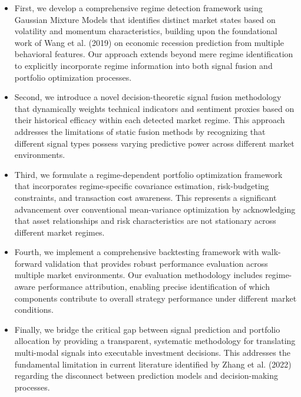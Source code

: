 \documentclass{singlecol-new}
\theoremstyle{TH}{
\newtheorem{lemma}{Lemma}
\newtheorem{theorem}[lemma]{Theorem}
\newtheorem{corrolary}[lemma]{Corrolary}
\newtheorem{conjecture}[lemma]{Conjecture}
\newtheorem{proposition}[lemma]{Proposition}
\newtheorem{claim}[lemma]{Claim}
\newtheorem{stheorem}[lemma]{Wrong Theorem}
\newtheorem{algorithm}{Algorithm}
}
\theoremstyle{THrm}{
\newtheorem{definition}{Definition}[section]
\newtheorem{question}{Question}[section]
\newtheorem{remark}{Remark}
\newtheorem{scheme}{Scheme}
}
\theoremstyle{THhit}{
\newtheorem{case}{Case}[section]
}
\begin{document}
\begin{itemize}

\item First, we develop a comprehensive regime detection framework using Gaussian Mixture Models that identifies distinct market states based on volatility and momentum characteristics, building upon the foundational work of Wang et al. (2019) on economic recession prediction from multiple behavioral features. Our approach extends beyond mere regime identification to explicitly incorporate regime information into both signal fusion and portfolio optimization processes.

\item Second, we introduce a novel decision-theoretic signal fusion methodology that dynamically weights technical indicators and sentiment proxies based on their historical efficacy within each detected market regime. This approach addresses the limitations of static fusion methods by recognizing that different signal types possess varying predictive power across different market environments.

\item Third, we formulate a regime-dependent portfolio optimization framework that incorporates regime-specific covariance estimation, risk-budgeting constraints, and transaction cost awareness. This represents a significant advancement over conventional mean-variance optimization by acknowledging that asset relationships and risk characteristics are not stationary across different market regimes.

\item Fourth, we implement a comprehensive backtesting framework with walk-forward validation that provides robust performance evaluation across multiple market environments. Our evaluation methodology includes regime-aware performance attribution, enabling precise identification of which components contribute to overall strategy performance under different market conditions.

\item Finally, we bridge the critical gap between signal prediction and portfolio allocation by providing a transparent, systematic methodology for translating multi-modal signals into executable investment decisions. This addresses the fundamental limitation in current literature identified by Zhang et al. (2022) regarding the disconnect between prediction models and decision-making processes.
\end{itemize}
\end{document}
